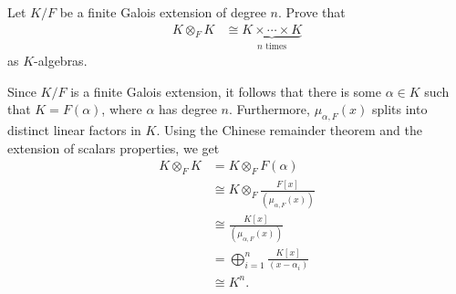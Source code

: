 \documentclass[10pt]{mypackage}
\begin{document}
\begin{problem}[Problem 8]
  Let $K/F$ be a finite Galois extension of degree $n$. Prove that
  \begin{align*}
    K\otimes_{F}K &\cong \underbrace{K\times\cdots\times K}_{\text{$n$ times}}
  \end{align*}
  as $K$-algebras.
\end{problem}
\begin{solution}
  Since $K/F$ is a finite Galois extension, it follows that there is some $\alpha\in K$ such that $K = F\left( \alpha \right)$, where $\alpha$ has degree $n$. Furthermore, $\mu_{\alpha,F}(x)$ splits into distinct linear factors in $K$. Using the Chinese remainder theorem and the extension of scalars properties, we get
  \begin{align*}
    K\otimes_{F}K &= K\otimes_{F} F\left( \alpha \right)\\
                  &\cong K\otimes_{F} \frac{F\left[ x \right]}{\left( \mu_{\alpha,F}(x) \right)}\\
                  &\cong \frac{K\left[ x \right]}{\left( \mu_{\alpha,F}(x) \right)}\\
                  &= \bigoplus_{i=1}^{n} \frac{K\left[ x \right]}{\left( x-\alpha_i \right)}\\
                  &\cong K^{n}.
  \end{align*}
\end{solution}
\end{document}
